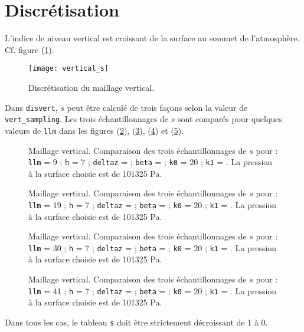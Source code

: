 \documentclass[a4paper,french]{article}
\begin{document}
\section{Discrétisation}

L'indice de niveau vertical est croissant de la surface au sommet de
l'atmosphère.  Cf. figure (\ref{fig:vertical_s}).
\begin{figure}[htbp]
  \centering
  \texttt{[image: vertical\_s]}
  \caption{Discrétisation du maillage vertical.}
  \label{fig:vertical_s}
\end{figure}

Dans \verb+disvert+, $s$ peut être calculé de trois façons selon la
valeur de \verb+vert_sampling+. Les trois échantillonnages de $s$ sont
comparés pour quelques valeurs de \verb+llm+ dans les figures
(\ref{fig:compare_sampl_9}), (\ref{fig:compare_sampl_19}),
(\ref{fig:compare_sampl_30}) et (\ref{fig:compare_sampl_41}).
\begin{figure}[htbp]
  \centering
  
  \caption[Maillage vertical, échantillonnages de $s$ pour :
  \texttt{llm} = 9]{Maillage vertical.  Comparaison des trois
    échantillonnages de $s$ pour : \texttt{llm} = 9 ; \texttt{h} = 7 ;
    \texttt{deltaz} =  ; \texttt{beta} =  ;
    \texttt{k0} = 20 ; \texttt{k1} = . La pression à la
    surface choisie est de 101325 Pa.}
  \label{fig:compare_sampl_9}
\end{figure}
\begin{figure}[htbp]
  \centering
  
  \caption[Maillage vertical, échantillonnages de $s$ pour :
  \texttt{llm} = 19]{Maillage vertical.  Comparaison des trois
    échantillonnages de $s$ pour : \texttt{llm} = 19 ; \texttt{h} = 7
    ; \texttt{deltaz} =  ; \texttt{beta} =  ;
    \texttt{k0} = 20 ; \texttt{k1} = . La pression à la
    surface choisie est de 101325 Pa.}
  \label{fig:compare_sampl_19}
\end{figure}
\begin{figure}[htbp]
  \centering
  
  \caption[Maillage vertical, échantillonnages de $s$ pour :
  \texttt{llm} = 30]{Maillage vertical.  Comparaison des trois
    échantillonnages de $s$ pour : \texttt{llm} = 30 ; \texttt{h} = 7
    ; \texttt{deltaz} =  ; \texttt{beta} =  ;
    \texttt{k0} = 20 ; \texttt{k1} = . La pression à la
    surface choisie est de 101325 Pa.}
  \label{fig:compare_sampl_30}
\end{figure}
\begin{figure}[htbp]
  \centering
  
  \caption[Maillage vertical, échantillonnages de $s$ pour :
  \texttt{llm} = 41]{Maillage vertical.  Comparaison des trois
    échantillonnages de $s$ pour : \texttt{llm} = 41 ; \texttt{h} = 7
    ; \texttt{deltaz} =  ; \texttt{beta} =  ;
    \texttt{k0} = 20 ; \texttt{k1} = . La pression à la
    surface choisie est de 101325 Pa.}
  \label{fig:compare_sampl_41}
\end{figure}
Dans tous les cas, le tableau \verb+s+ doit être strictement
décroissant de 1 à 0.
\end{document}
